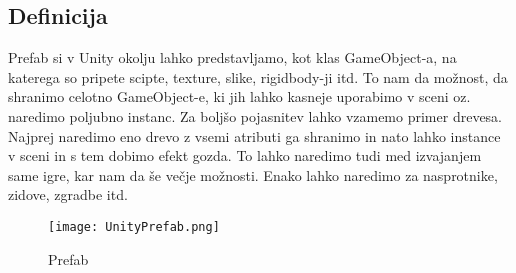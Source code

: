 {\color{indiagreen}\subsection{Definicija}}
Prefab si v Unity okolju lahko predstavljamo, kot klas GameObject-a, na katerega so pripete scipte, texture, slike, rigidbody-ji itd. To nam da možnost, da shranimo celotno GameObject-e, ki jih lahko kasneje uporabimo v sceni oz. naredimo poljubno instanc. Za boljšo pojasnitev lahko vzamemo primer drevesa. Najprej naredimo eno drevo z vsemi atributi ga shranimo in nato lahko instance v sceni in s tem dobimo efekt gozda. To lahko naredimo tudi med izvajanjem same igre, kar nam da še večje možnosti. Enako lahko naredimo za nasprotnike, zidove, zgradbe itd.
\begin{figure}[h]
	\centering
	\texttt{[image: UnityPrefab.png]}
	\caption{Prefab}
\end{figure}